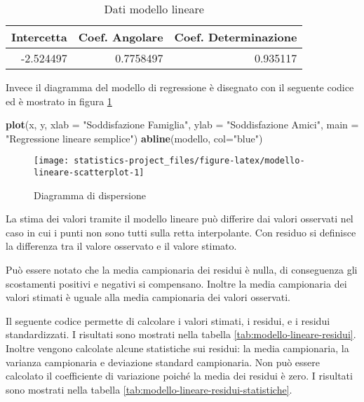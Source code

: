 \documentclass[]{book}
\newenvironment{Shaded}{\begin{snugshade}}{\end{snugshade}}
\newcommand{\KeywordTok}[1]{\textcolor[rgb]{0.13,0.29,0.53}{\textbf{#1}}}
\newcommand{\DataTypeTok}[1]{\textcolor[rgb]{0.13,0.29,0.53}{#1}}
\newcommand{\StringTok}[1]{\textcolor[rgb]{0.31,0.60,0.02}{#1}}
\newcommand{\NormalTok}[1]{#1}
\begin{document}
\begin{table}

\caption{\label{tab:modello-lineare-dati}Dati modello lineare}
\centering
\begin{tabular}[t]{r|r|r}
\hline
Intercetta & Coef. Angolare & Coef. Determinazione\\
\hline
-2.524497 & 0.7758497 & 0.935117\\
\hline
\end{tabular}
\end{table}

Invece il diagramma del modello di regressione è disegnato con il
seguente codice ed è mostrato in figura
\ref{fig:modello-lineare-scatterplot}

\begin{Shaded}
\begin{Highlighting}[]
\KeywordTok{plot}\NormalTok{(x, y, }\DataTypeTok{xlab =} \StringTok{"Soddisfazione Famiglia"}\NormalTok{, }
     \DataTypeTok{ylab =} \StringTok{"Soddisfazione Amici"}\NormalTok{, }
     \DataTypeTok{main =} \StringTok{"Regressione lineare semplice"}\NormalTok{)}
\KeywordTok{abline}\NormalTok{(modello, }\DataTypeTok{col=}\StringTok{"blue"}\NormalTok{)  }
\end{Highlighting}
\end{Shaded}

\begin{figure}

{\centering \texttt{[image: statistics-project\_files/figure-latex/modello-lineare-scatterplot-1]} 

}

\caption{Diagramma di dispersione}\label{fig:modello-lineare-scatterplot}
\end{figure}

La stima dei valori tramite il modello lineare può differire dai valori
osservati nel caso in cui i punti non sono tutti sulla retta
interpolante. Con residuo si definisce la differenza tra il valore
osservato e il valore stimato.

Può essere notato che la media campionaria dei residui è nulla, di
conseguenza gli scostamenti positivi e negativi si compensano. Inoltre
la media campionaria dei valori stimati è uguale alla media campionaria
dei valori osservati.

Il seguente codice permette di calcolare i valori stimati, i residui, e
i residui standardizzati. I risultati sono mostrati nella tabella
\ref{tab:modello-lineare-residui}.\\
Inoltre vengono calcolate alcune statistiche sui residui: la media
campionaria, la varianza campionaria e deviazione standard campionaria.
Non può essere calcolato il coefficiente di variazione poiché la media
dei residui è zero. I risultati sono mostrati nella tabella
\ref{tab:modello-lineare-residui-statistiche}.
\end{document}
